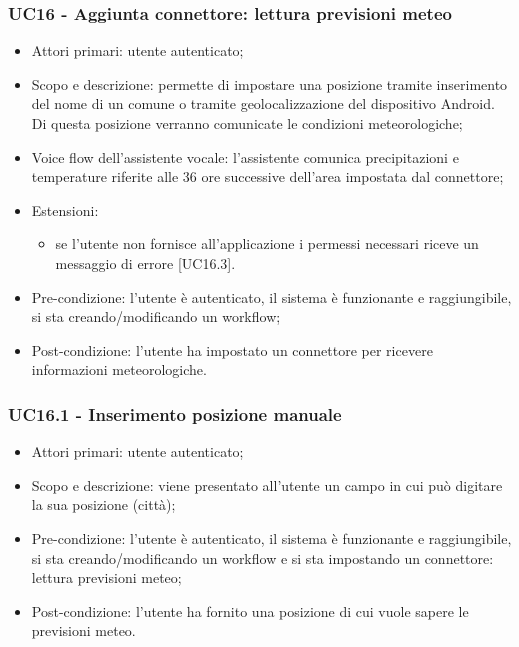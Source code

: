 \subsubsection{UC16 - Aggiunta connettore: lettura previsioni meteo}
\begin{itemize}
	\item  Attori primari: utente autenticato;
	\item  Scopo e descrizione: permette di impostare una posizione tramite inserimento del nome di un comune o tramite geolocalizzazione del dispositivo Android. Di questa posizione verranno comunicate le condizioni meteorologiche;
	\item  Voice flow dell'assistente vocale: l'assistente comunica precipitazioni e temperature riferite alle 36 ore successive dell'area impostata dal connettore;
	\item  Estensioni: 
		   \begin{itemize}
				\item se l'utente non fornisce all'applicazione i permessi necessari riceve un messaggio di errore [UC16.3].
		   \end{itemize}
	\item  Pre-condizione: l'utente è autenticato, il sistema è funzionante e raggiungibile, si sta creando/modificando un workflow;
	\item  Post-condizione: l'utente ha impostato un connettore per ricevere informazioni meteorologiche.
\end{itemize}
\subsubsection{UC16.1 - Inserimento posizione manuale}
\begin{itemize}
	\item  Attori primari: utente autenticato;
	\item  Scopo e descrizione: viene presentato all'utente un campo in cui può digitare la sua posizione (città);
	\item  Pre-condizione: l'utente è autenticato, il sistema è funzionante e raggiungibile, si sta creando/modificando un workflow e si sta impostando un connettore: lettura previsioni meteo;
	\item  Post-condizione: l'utente ha fornito una posizione di cui vuole sapere le previsioni meteo.
\end{itemize}

